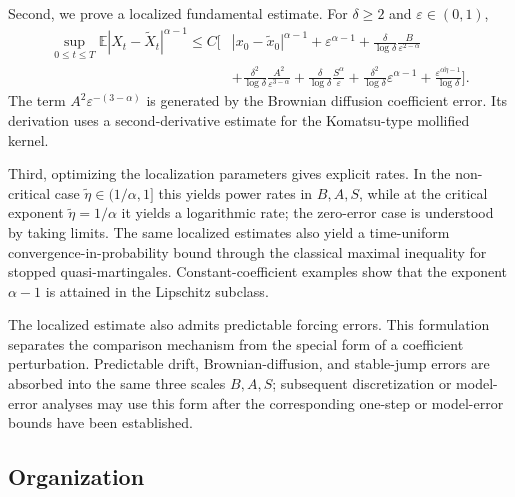 \documentclass[11pt]{article}
\newcommand{\1}{\mathbf{1}}
\newcommand{\wt}{\tilde}
\newcommand{\eps}{\varepsilon}
\begin{document}
Second, we prove a localized fundamental estimate. For $\delta\ge2$ and $\eps\in(0,1)$,
\begin{align*}
\sup_{0\le t\le T}\mathbb E|X_t-\wt X_t|^{\alpha-1}
\le C\Bigg[&|x_0-\wt x_0|^{\alpha-1}
+\eps^{\alpha-1}
+\frac{\delta}{\log\delta}\frac{B}{\eps^{2-\alpha}}\\
&+\frac{\delta^2}{\log\delta}\frac{A^2}{\eps^{3-\alpha}}
+\frac{\delta}{\log\delta}\frac{S^\alpha}{\eps}
+\frac{\delta^2}{\log\delta}\eps^{\alpha-1}
+\frac{\eps^{\alpha\wt\eta-1}}{\log\delta}
\Bigg].
\end{align*}
The term $A^2\eps^{-(3-\alpha)}$ is generated by the Brownian diffusion coefficient error. Its derivation uses a second-derivative estimate for the Komatsu-type mollified kernel.

Third, optimizing the localization parameters gives explicit rates. In the non-critical case $\wt\eta\in(1/\alpha,1]$ this yields power rates in $B,A,S$, while at the critical exponent $\wt\eta=1/\alpha$ it yields a logarithmic rate; the zero-error case is understood by taking limits. The same localized estimates also yield a time-uniform convergence-in-probability bound through the classical maximal inequality for stopped quasi-martingales. Constant-coefficient examples show that the exponent $\alpha-1$ is attained in the Lipschitz subclass.

The localized estimate also admits predictable forcing errors. This formulation separates the comparison mechanism from the special form of a coefficient perturbation. Predictable drift, Brownian-diffusion, and stable-jump errors are absorbed into the same three scales $B,A,S$; subsequent discretization or model-error analyses may use this form after the corresponding one-step or model-error bounds have been established.

\subsection{Organization}
\label{subsec:organization}
\end{document}

